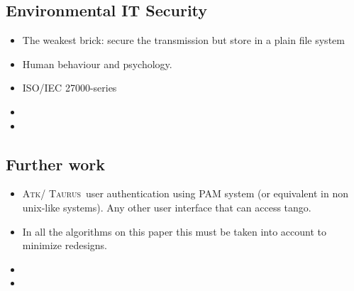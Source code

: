 \documentclass[10pt,a4paper,twoside]{llncs}
\newcommand{\taurus}{\textsc{Taurus}}
\newcommand{\atk}{\textsc{Atk}}
\begin{document}
%
\subsection{Environmental IT Security \label{sec:environment}}

\begin{itemize}
 \item The weakest brick: secure the transmission but store in a plain file system
 \item Human behaviour and psychology.
 \item ISO/IEC 27000-series
 \item 
 \item
\end{itemize}

%
\subsection{Further work \label{sec:further}}

\begin{itemize}
\item \atk/ \taurus\, user authentication using PAM system (or equivalent in non unix-like systems). Any other user interface that can access tango.
\item In all the algorithms on this paper this must be taken into account to minimize redesigns.
\item
\item
\end{itemize}




\end{document}
